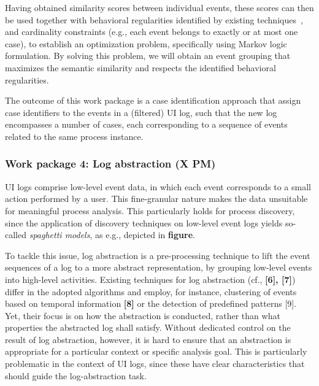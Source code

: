  Having obtained similarity scores between individual events, these scores can then be used together with behavioral regularities identified by existing techniques~\cite{ref}, and cardinality constraints (e.g., each event belongs to exactly or at most one case), to establish an optimization problem, specifically using Markov logic formulation. By solving this problem, we will obtain an event grouping that maximizes the semantic similarity and respects the identified behavioral regularities.

The outcome of this work package is a case identification approach that assign case identifiers to the events in a (filtered) UI log, such that the new log encompasses a number of cases, each corresponding to a sequence of events related to the same process instance.





\subsubsection{Work package 4: Log abstraction (X PM)}
\label{sec:wp4}

UI logs comprise low-level event data, in which each event corresponds to a small action performed by a user. This fine-granular nature makes the data unsuitable for meaningful process analysis. This particularly holds for process discovery, since the application of discovery techniques on low-level event logs yields so-called \emph{spaghetti models}, as e.g., depicted in \textbf{figure}.

To tackle this issue, log abstraction is a pre-processing technique to lift the event sequences of a log to a more abstract representation, by grouping low-level events into high-level activities. Existing techniques for log abstraction (cf., \textbf{[6], [7]}) differ in the adopted algorithms and employ, for instance, clustering of events based on temporal information \textbf{[8]} or the detection of predefined patterns [9]. Yet, their focus is on how the abstraction is conducted, rather than what properties the abstracted log shall satisfy. Without dedicated control on the result of log abstraction, however, it is hard to ensure that an abstraction is appropriate for a particular context or specific analysis goal.
This is particularly problematic in the context of UI logs, since these have clear characteristics that should guide the log-abstraction task.

